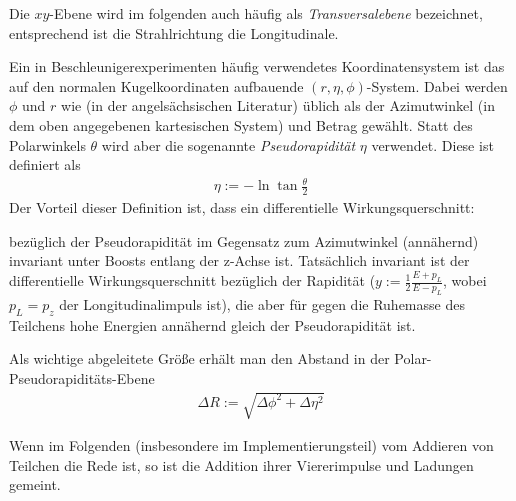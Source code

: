 Die $xy$-Ebene wird im folgenden auch häufig als \emph{Transversalebene}
bezeichnet, entsprechend ist die Strahlrichtung die Longitudinale.

Ein in Beschleunigerexperimenten häufig verwendetes Koordinatensystem ist das
auf den normalen Kugelkoordinaten aufbauende $(r, \eta, \phi)$-System.  Dabei
werden $\phi$ und $r$ wie (in der angelsächsischen Literatur) üblich als der
Azimutwinkel (in dem oben angegebenen kartesischen System) und Betrag gewählt.
Statt des Polarwinkels $\theta$ wird aber die sogenannte \emph{Pseudorapidität}
$\eta$ verwendet. Diese ist definiert als
\begin{align}
  \eta := -\ln{\tan{\frac \theta 2}}
\end{align}
Der Vorteil dieser Definition ist, dass ein differentielle Wirkungsquerschnitt:


bezüglich der Pseudorapidität im Gegensatz zum Azimutwinkel (annähernd)
invariant unter Boosts entlang der z-Achse ist.  Tatsächlich invariant ist der
differentielle Wirkungsquerschnitt bezüglich der Rapidität ($y := \frac12
\frac{E + p_L}{E - p_L}$, wobei $p_L = p_z$ der Longitudinalimpuls ist), die
aber für gegen die Ruhemasse des Teilchens hohe Energien annähernd gleich der
Pseudorapidität ist.

Als wichtige abgeleitete Größe erhält man den Abstand in der
Polar-Pseudorapiditäts-Ebene
\begin{align}
  \Delta R := \sqrt{\Delta\phi^2 + \Delta\eta^2}
  \label{def:dr}
\end{align}

Wenn im Folgenden (insbesondere im Implementierungsteil) vom Addieren von
Teilchen die Rede ist, so ist die Addition ihrer Viererimpulse und Ladungen
gemeint.
